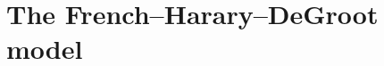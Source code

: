 \documentclass[10pt, aspectratio=169]{beamer}
\begin{document}
\section{The French--Harary--DeGroot model}

\end{document}
